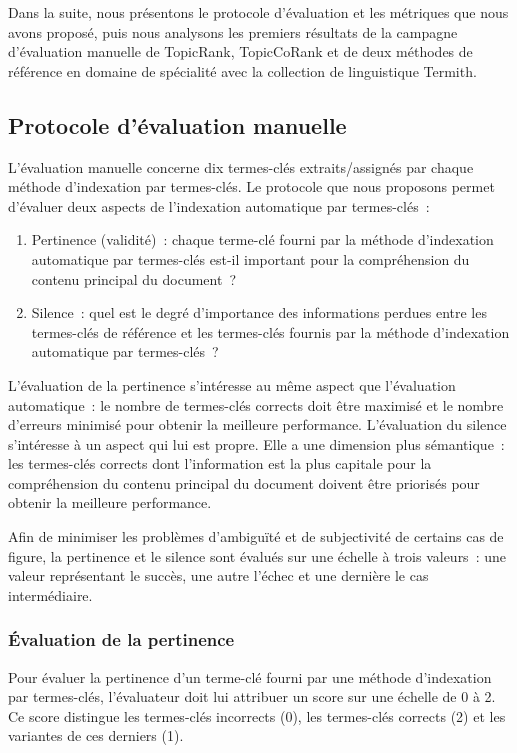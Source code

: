     Dans la suite, nous présentons le protocole d'évaluation et les métriques
    que nous avons proposé, puis nous analysons les premiers résultats de la
    campagne d'évaluation manuelle de TopicRank, TopicCoRank et de deux méthodes de référence en
    domaine de spécialité avec la collection de linguistique Termith.

    \subsection{Protocole d'évaluation manuelle}
    \label{subsec:main-automatic_evaluation_of_keyphrase_annotation-methodology-evaluation_protocol}
      L'évaluation manuelle concerne dix termes-clés extraits/assignés par
      chaque méthode d'indexation par termes-clés. Le protocole que nous
      proposons permet d'évaluer deux aspects de l'indexation automatique par
      termes-clés~:
      \begin{enumerate}
        \item{Pertinence (validité)~: chaque terme-clé fourni par la méthode
              d'indexation automatique par termes-clés est-il important pour la
              compréhension du contenu principal du document~?}
        \item{Silence~: quel est le degré d'importance des informations perdues
              entre les termes-clés de référence et les termes-clés fournis par
              la méthode d'indexation automatique par termes-clés~?}
      \end{enumerate}
      L'évaluation de la pertinence s'intéresse au même aspect que l'évaluation
      automatique~: le nombre de termes-clés corrects doit être maximisé et le
      nombre d'erreurs minimisé pour obtenir la meilleure performance.
      L'évaluation du silence s'intéresse à un aspect qui lui est propre. Elle a
      une dimension plus sémantique~: les termes-clés corrects dont
      l'information est la plus capitale pour la compréhension du contenu
      principal du document doivent être priorisés pour obtenir la meilleure
      performance.

      Afin de minimiser les problèmes d'ambiguïté et de subjectivité de certains
      cas de figure, la pertinence et le silence sont évalués sur une échelle à
      trois valeurs~: une valeur représentant le succès, une autre l'échec et
      une dernière le cas intermédiaire.

      \subsubsection{Évaluation de la pertinence}
      \label{subsubsec:main-automatic_evaluation_of_keyphrase_annotation-methodology-evaluation_protocol-relevancy}
        Pour évaluer la pertinence d'un terme-clé fourni par une méthode
        d'indexation par termes-clés, l'évaluateur doit lui attribuer un score
        sur une échelle de 0 à 2. Ce score distingue les termes-clés incorrects
        (0), les termes-clés corrects (2) et les variantes de ces derniers (1).

